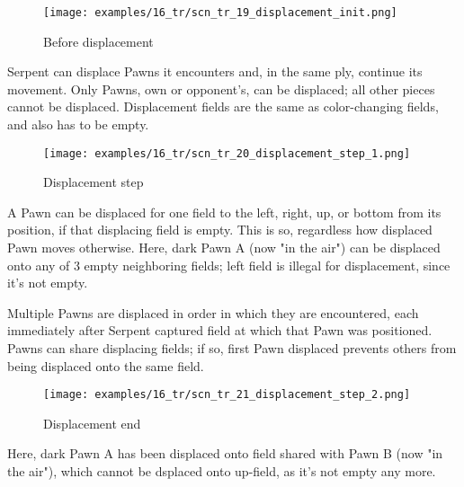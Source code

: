 \noindent
\begin{wrapfigure}[9]{l}{0.4\textwidth}
\centering
\texttt{[image: examples/16\_tr/scn\_tr\_19\_displacement\_init.png]}
\vspace*{-0.5\baselineskip}
\caption{Before displacement}
\label{fig:scn_tr_19_displacement_init}
\end{wrapfigure}
Serpent can displace Pawns it encounters and, in the same ply, continue its movement.
Only Pawns, own or opponent's, can be displaced; all other pieces cannot be displaced. \newline
\indent
Displacement fields are the same as color-changing fields, and also has to be empty.

\vspace*{1.3\baselineskip}
\noindent
\begin{wrapfigure}[11]{l}{0.4\textwidth}
\centering
\texttt{[image: examples/16\_tr/scn\_tr\_20\_displacement\_step\_1.png]}
\vspace*{-0.5\baselineskip}
\caption{Displacement step}
\label{fig:scn_tr_20_displacement_step_1}
\end{wrapfigure}
A Pawn can be displaced for one field to the left, right, up, or bottom from
its position, if that displacing field is empty. This is so, regardless how displaced
Pawn moves otherwise. \newline
\indent
Here, dark Pawn A (now "in the air") can be displaced onto any of 3 empty neighboring
fields; left field is illegal for displacement, since it's not empty.

\vspace*{-0.8\baselineskip}
\mbox{} \newline %
Multiple Pawns are displaced in order in which they are encountered, each immediately
after Serpent captured field at which that Pawn was positioned. Pawns can share
displacing fields; if so, first Pawn displaced prevents others from being displaced
onto the same field.

\clearpage %

\noindent
\begin{wrapfigure}[5]{l}{0.4\textwidth}
\centering
\texttt{[image: examples/16\_tr/scn\_tr\_21\_displacement\_step\_2.png]}
\vspace*{-0.5\baselineskip}
\caption{Displacement end}
\label{fig:scn_tr_21_displacement_step_2}
\end{wrapfigure}
Here, dark Pawn A has been displaced onto field shared with Pawn B (now "in the air"),
which cannot be dsplaced onto up-field, as it's not empty any more.

